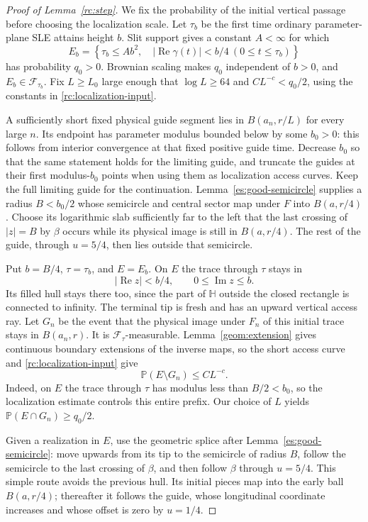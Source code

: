 \begin{proof}[Proof of Lemma~\ref{rc:step}]
We fix the probability of the initial vertical passage before choosing
the localization scale. Let $\tau_b$ be the first time ordinary
parameter-plane SLE attains height $b$. Slit support gives a constant
$A<\infty$ for which
\[
 E_b=\left\{\tau_b\le Ab^2,\quad
       |\operatorname{Re}\gamma(t)|<b/4\ (0\le t\le\tau_b)\right\}
\]
has probability $q_0>0$. Brownian scaling makes $q_0$ independent of
$b>0$, and $E_b\in\mathcal F_{\tau_b}$. Fix $L\ge L_0$ large enough that
$\log L\ge64$ and $CL^{-c}<q_0/2$, using the constants in
\eqref{rc:localization-input}.

A sufficiently short fixed physical guide segment lies in
$B(a_n,r/L)$ for every large $n$. Its endpoint has parameter modulus
bounded below by some $b_0>0$: this follows from interior convergence
at that fixed positive guide time. Decrease $b_0$ so that the same
statement holds for the limiting guide, and truncate the guides at
their first modulus-$b_0$ points when using them as localization
access curves. Keep the full limiting guide for the continuation.
Lemma~\ref{es:good-semicircle}
supplies a radius $B<b_0/2$ whose semicircle and central sector map
under $F$ into $B(a,r/4)$. Choose its logarithmic slab sufficiently
far to the left that the last crossing of $|z|=B$ by $\beta$ occurs
while its physical image is still in $B(a,r/4)$. The rest of the guide,
through $u=5/4$, then lies outside that semicircle.

Put $b=B/4$, $\tau=\tau_b$, and $E=E_b$. On $E$ the trace through
$\tau$ stays in
\[
 |\operatorname{Re}z|<b/4,\qquad 0\le\operatorname{Im}z\le b.
\]
Its filled hull stays there too, since the part of $\mathbb H$ outside
the closed rectangle is connected to infinity. The terminal tip is fresh
and has an upward vertical access ray. Let $G_n$ be the event that the
physical image under $F_n$ of this initial trace stays in $B(a_n,r)$.
It is $\mathcal F_\tau$-measurable. Lemma~\ref{geom:extension} gives
continuous boundary extensions of the inverse maps, so the short access
curve and \eqref{rc:localization-input} give
\[
 \mathbb P(E\setminus G_n)\le CL^{-c}.
\]
Indeed, on $E$ the trace through $\tau$ has modulus less than
$B/2<b_0$, so the localization estimate controls this entire prefix.
Our choice of $L$ yields $\mathbb P(E\cap G_n)\ge q_0/2$.

Given a realization in $E$, use the geometric splice after
Lemma~\ref{es:good-semicircle}: move upwards from its tip to the
semicircle of radius $B$, follow the semicircle to the last crossing
of $\beta$, and then follow $\beta$ through $u=5/4$. This simple route
avoids the previous hull. Its initial pieces map into the early ball
$B(a,r/4)$; thereafter it follows the guide, whose longitudinal
coordinate increases and whose offset is zero by $u=1/4$.


\end{proof}
